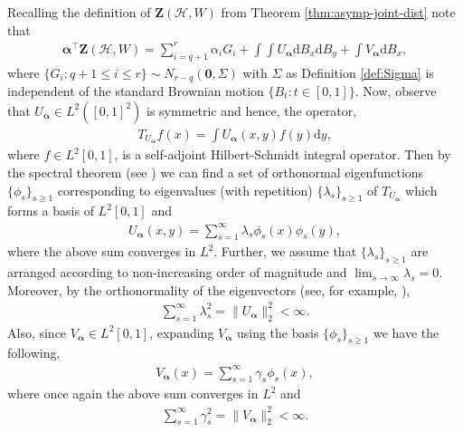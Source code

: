 \documentclass[11pt,reqno]{amsart}
\numberwithin{equation}{section}
\theoremstyle{definition}
\begin{document}
Recalling the definition of $\bm{Z}(\mathcal{H},W)$ from Theorem \ref{thm:asymp-joint-dist} note that 
\begin{align}\label{eq:alpha-t-Z}
    \bm{\alpha}^{\top}\bm{Z}(\mathcal{H},W) = \sum_{i=q+1}^{r}\alpha_{i}G_{i} + \int\int U_{\bm \alpha}\mathrm{d}B_{x}\mathrm{d}B_{y} + \int V_{\bm \alpha}\mathrm{d}B_{x} , 
\end{align}
where $\{G_{i}: q+1\leq i\leq r\}\sim N_{r-q}(\bm{0},\Sigma)$ with $\Sigma$ as Definition \ref{def:Sigma} is independent of the standard Brownian motion $\{B_{t}:t\in [0,1]\}$. Now, observe that $U_{\bm \alpha} \in L^{2}([0,1]^{2})$ is symmetric and hence,  the operator,
\begin{align}\label{eq:def-TU}
    T_{U_{\bm \alpha}}f(x) = \int U_{\bm \alpha}(x,y)f(y)\mathrm{d}y, 
\end{align} 
where $f\in L^{2}[0,1]$, is a self-adjoint Hilbert-Schmidt integral operator. Then by the spectral theorem (see \cite[Theorem 8.94 and Theorem 8.83]{renardy2006introduction}) we can find a set of orthonormal eigenfunctions $\{\phi_{s}\}_{s \geq 1}$ corresponding to eigenvalues (with repetition) $\{\lambda_{s}\}_{s \geq 1}$ of $T_{U_{\bm \alpha}}$ which forms a basis of $L^{2}[0,1]$ and 
\begin{align}\label{eq:operator-expansion}
    U_{\bm \alpha}(x, y) = \sum_{s=1}^{\infty}\lambda_{s}\phi_{s}(x)\phi_{s}(y) , 
\end{align}
where the above sum converges in $L^{2}$. Further, we assume that $\{\lambda_{s}\}_{s \geq 1}$ are arranged according to non-increasing order of magnitude and $\lim_{s \rightarrow \infty} \lambda_{s} = 0$. 
Moreover, by the orthonormality of the eigenvectors (see, for example, \cite[Lemma 8, Chapter 6]{laxfunctional}),  
\begin{align}\label{eq:lambda-sum-finite}
   \sum_{s=1}^{\infty}\lambda_{s}^{2} = \|U_{\bm \alpha}\|_{2}^{2}<\infty.
\end{align}
Also, since $V_{\bm \alpha} \in L^{2}[0,1]$, expanding $V_{\bm \alpha}$ using the basis $\{\phi_s\}_{s \geq 1}$ 
we have the following, 
\begin{align}\label{eq:V-expansion}
    V_{\bm \alpha}(x) = \sum_{s=1}^{\infty} \gamma_{s}\phi_{s}(x), 
\end{align} 
where once again the above sum converges in $L^{2}$ and 
\begin{align}\label{eq:def-delta-i}
    \sum_{s=1}^{\infty} \gamma_{s}^{2} = \|V_{\bm \alpha}\|_{2}^{2}<\infty .
\end{align}
\end{document}
